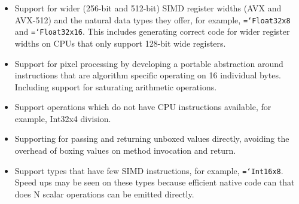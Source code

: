 \documentclass[preprint]{sigplanconf}
\newcommand{\ttt}[1]{{\texttt{\hyphenchar\font=`\-\relax #1}}}%
\begin{document}
\begin{itemize} 
\item
Support for wider (256-bit and 512-bit) SIMD register widths (AVX and AVX-512)
and the natural data types they offer, for example, \ttt{Float32x8} and
\ttt{Float32x16}. This includes generating correct code for wider register
widths on CPUs that only support 128-bit wide registers.

\item
Support for pixel processing by developing a portable abstraction around
instructions that are algorithm specific operating on 16 individual bytes.
Including support for saturating arithmetic operations.

\item
Support operations which do not have CPU instructions available, for example,
Int32x4 division.

\item
Supporting for passing and returning unboxed values directly, avoiding the
overhead of boxing values on method invocation and return.

\item
Support types that have few SIMD instructions, for example, \ttt{Int16x8}. Speed
ups may be seen on these types because efficient native code can that does N
scalar operations can be emitted directly.

\end{itemize}



\end{document}
